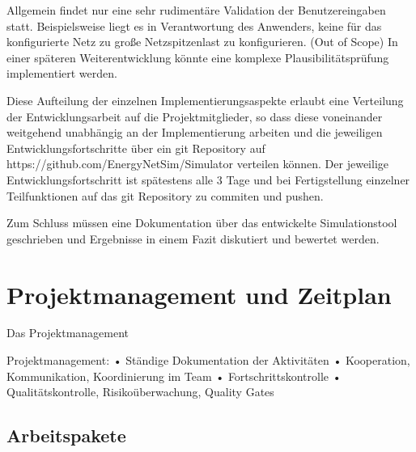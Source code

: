 \documentclass[12pt,titlepage]{article}
\begin{document}
Allgemein findet nur eine sehr rudimentäre Validation der Benutzereingaben statt. Beispielsweise liegt es in Verantwortung des Anwenders, keine für das konfigurierte Netz zu große Netzspitzenlast zu konfigurieren. (Out of Scope) In einer späteren Weiterentwicklung könnte eine komplexe Plausibilitätsprüfung implementiert werden.
 
Diese Aufteilung der einzelnen Implementierungsaspekte erlaubt eine Verteilung der Entwicklungsarbeit auf die Projektmitglieder, so dass diese voneinander weitgehend unabhängig an der Implementierung arbeiten und die jeweiligen Entwicklungsfortschritte über ein git Repository auf https://github.com/EnergyNetSim/Simulator verteilen können. Der jeweilige Entwicklungsfortschritt ist spätestens alle 3 Tage und bei Fertigstellung einzelner Teilfunktionen auf das git Repository zu commiten und pushen.
 
Zum Schluss müssen eine Dokumentation über das entwickelte Simulationstool geschrieben und Ergebnisse in einem Fazit diskutiert und bewertet werden. 
 
 




\section{Projektmanagement und Zeitplan}
Das Projektmanagement

 
 
Projektmanagement:
•	Ständige Dokumentation der Aktivitäten
•	Kooperation, Kommunikation, Koordinierung im Team
•	Fortschrittskontrolle
•	Qualitätskontrolle, Risikoüberwachung, Quality Gates
 
 
 
\subsection{Arbeitspakete}
\end{document}
